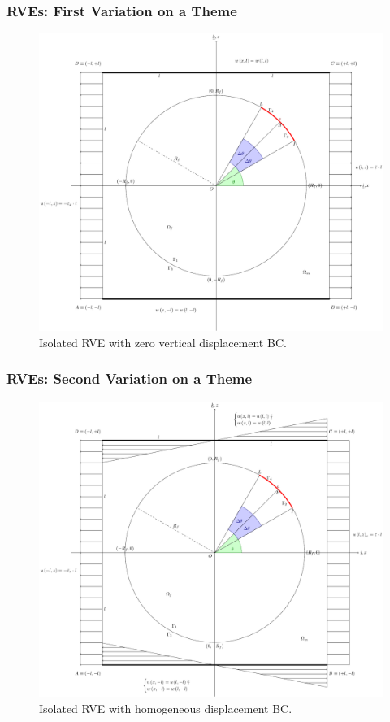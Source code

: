 \documentclass[first,firstsupp,lastsupp,handout,last,hyperref,table]{ETHclass}
\begin{document}
\begin{frame}
\frametitle{RVEs: First Variation on a Theme}
\vspace{-0.25cm}
\centering
\begin{figure}
\centering
\includegraphics[height=0.7\textheight]{LEFM2DsRVEsFsDdepverdispBCULappAxialDispLR.pdf}
\caption{\scriptsize Isolated RVE with zero vertical displacement BC.}
\label{fig:singleRVE-rigid}
\end{figure}
\end{frame}

\begin{frame}
\frametitle{RVEs: Second Variation on a Theme}
\vspace{-0.25cm}
\centering
\begin{figure}
\centering
\includegraphics[height=0.7\textheight]{LEFM2DsRVEsFsDhomoBCULappAxialDispLR.pdf}
\caption{\scriptsize Isolated RVE with homogeneous displacement BC.}
\label{fig:singleRVE-homo}
\end{figure}
\end{frame}
\end{document}
